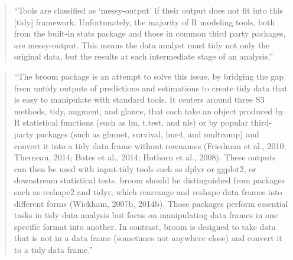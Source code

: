 \documentclass[]{tufte-book}
\begin{document}
\begin{quote}
``Tools are classified as `messy-output' if their output does not fit into this
{[}tidy{]} framework. Unfortunately, the majority of R modeling tools, both from the
built-in stats package and those in common third party packages, are
messy-output. This means the data analyst must tidy not only the original data,
but the results at each intermediate stage of an analysis.'' \citep{robinson2014broom}
\end{quote}

\begin{quote}
``The broom package is an attempt to solve this issue, by bridging the gap from
untidy outputs of predictions and estimations to create tidy data that is easy
to manipulate with standard tools. It centers around three S3 methods, tidy,
augment, and glance, that each take an object produced by R statistical
functions (such as lm, t.test, and nls) or by popular third-party packages (such
as glmnet, survival, lme4, and multcomp) and convert it into a tidy data frame
without rownames (Friedman et al., 2010; Therneau, 2014; Bates et al., 2014;
Hothorn et al., 2008). These outputs can then be used with input-tidy tools such
as dplyr or ggplot2, or downstream statistical tests. broom should be
distinguished from packages such as reshape2 and tidyr, which rearrange and
reshape data frames into different forms (Wickham, 2007b, 2014b). Those packages
perform essential tasks in tidy data analysis but focus on manipulating data
frames in one specific format into another. In contrast, broom is designed to
take data that is not in a data frame (sometimes not anywhere close) and convert
it to a tidy data frame.'' \citep{robinson2014broom}
\end{quote}
\end{document}
